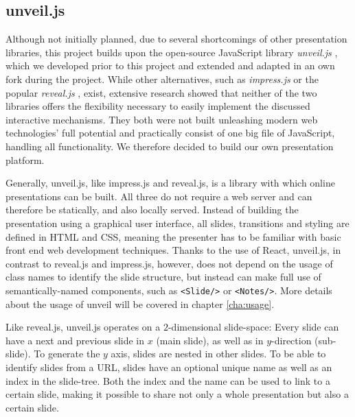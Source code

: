 \subsection{unveil.js}
\label{sec:implementation-technologies-unveil}
Although not initially planned, due to several shortcomings of other presentation libraries, this project builds upon the open-source JavaScript library \emph{unveil.js} \cite{unveil}, which we developed prior to this project and extended and adapted in an own fork \cite{unveil-fork} during the project. While other alternatives, such as \emph{impress.js} \cite{impressjs} or the popular \emph{reveal.js} \cite{revealjs}, exist, extensive research showed that neither of the two libraries offers the flexibility necessary to easily implement the discussed interactive mechanisms. They both were not built unleashing modern web technologies' full potential and practically consist of one big file of JavaScript, handling all functionality. We therefore decided to build our own presentation platform.

Generally, unveil.js, like impress.js and reveal.js, is a library with which online presentations can be built. All three do not require a web server and can therefore be statically, and also locally served. Instead of building the presentation using a graphical user interface, all slides, transitions and styling are defined in HTML and CSS, meaning the presenter has to be familiar with basic front end web development techniques. Thanks to the use of React, unveil.js, in contrast to reveal.js and impress.js, however, does not depend on the usage of class names to identify the slide structure, but instead can make full use of semantically-named components, such as \texttt{<Slide/>} or \texttt{<Notes/>}. More details about the usage of unveil will be covered in chapter \ref{cha:usage}.

Like reveal.js, unveil.js operates on a $2$-dimensional slide-space: Every slide can have a next and previous slide in $x$ (main slide), as well as in $y$-direction (sub-slide). To generate the $y$ axis, slides are nested in other slides.
To be able to identify slides from a URL, slides have an optional unique name as well as an index in the slide-tree. Both the index and the name can be used to link to a certain slide, making it possible to share not only a whole presentation but also a certain slide.

